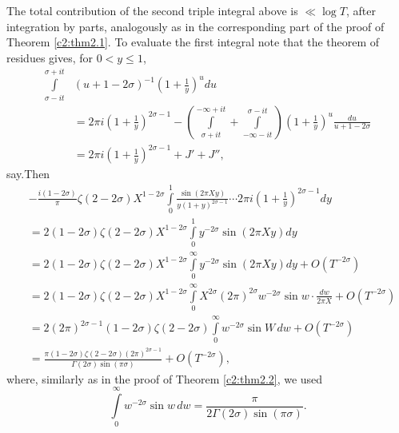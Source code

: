 The total contribution of the second triple integral above is $\ll
\log T$, after integration by parts, analogously as in the
corresponding part of the proof of Theorem \ref{c2:thm2.1}. To
evaluate the first integral note that the theorem of residues gives,
for $0 < y\leq 1$, 
\begin{align*}
  \int\limits_{\sigma- it}^{\sigma+ it} & (u+1 - 2 \sigma)^{-1} \left(1+
  \frac{1}{y}\right)^u du\\ 
  &= 2 \pi i \left( 1+ \frac{1}{y}\right)^{2\sigma -1}-
  \left(\int\limits_{\sigma+ it}^{- \infty + it}+ \int\limits_{-
    \infty - it}^{\sigma -it} \right) \left(1 + \frac{1}{y} \right)^u
  \frac{du}{u+1 - 2\sigma}\\
  & = 2 \pi i \left(1+ \frac{1}{y} \right)^{2 \sigma-1} + J' + J'',
\end{align*}
say.\pageoriginale Then
\begin{align*}
  & - \frac{i(1 - 2\sigma)}{\pi} \zeta (2 - 2 \sigma)X^{1- 2 \sigma}
  \int\limits_0^1 \frac{\sin(2 \pi Xy)}{y (1+ y)^{2 \sigma-1}} \cdots
  2 \pi i \left(1+ \frac{1}{y}\right)^{2 \sigma-1} dy\\
  & = 2 (1- 2 \sigma) \zeta (2 - 2 \sigma)X^{1- 2\sigma}
  \int\limits_0^1 y^{- 2\sigma} \sin (2 \pi X y)dy\\
  & = 2(1- 2 \sigma)\zeta (2- 2 \sigma)X^{1-2 \sigma}
  \int\limits_0^\infty y^{-2 \sigma} \sin (2 \pi Xy)dy + O(T^{- 2
    \sigma})\\
  & = 2 (1- 2 \sigma) \zeta (2 - 2 \sigma)X^{1- 2\sigma}
  \int\limits_0^\infty X^{2\sigma} (2 \pi)^{2 \sigma} w^{- 2 \sigma}
  \sin w \cdot \frac{dw}{2 \pi X} + O(T^{-2\sigma})\\
  & = 2(2 \pi)^{2 \sigma-1} (1- 2 \sigma) \zeta (2 - 2 \sigma)
  \int\limits_0^\infty w^{- 2 \sigma} \sin W \, dw+ O(T^{-2 \sigma})\\
  & = \frac{\pi (1- 2\sigma) \zeta (2- 2 \sigma)(2 \pi)^{2
      \sigma-1}}{\Gamma (2 \sigma) \sin (\pi \sigma)}+ O(T^{-2 \sigma}),
\end{align*}
where, similarly as in the proof of Theorem \eqref{c2:thm2.2}, we used
$$
\int\limits_0^\infty w^{- 2 \sigma} \sin w\, dw
 = \frac{\pi}{2 \Gamma(2 \sigma)\sin (\pi \sigma)}.
$$

